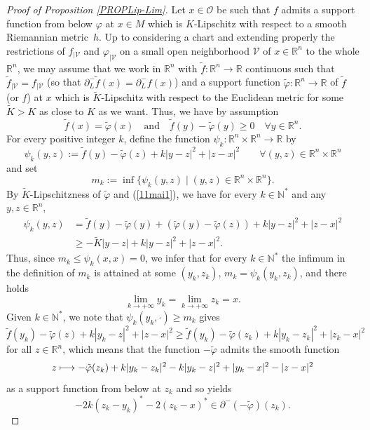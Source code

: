 \documentclass[JEP,XML,SOM,Unicode,NoFloatCountersInSection,published]{cedram}
\newcommand\mto{\mathchoice{\longmapsto}{\mapsto}{\mapsto}{\mapsto}}
\let\sep\mid
\newcommand\R{\mathbb R}
\newcommand\N{\mathbb N}
\theoremstyle{definition}
\begin{document}
\begin{proof}[Proof of Proposition \ref{PROPLip-Lim}]
Let $x\in \mathcal{O}$ be such that $f$ admits a support function from below $\varphi$ at $x\in M$ which is $K$-Lipschitz with respect to a smooth Riemannian metric~$h$. Up to considering a chart and extending properly the restrictions of $f_{\vert \mathcal{V}}$ and $\varphi_{\vert \mathcal{V}}$ on a small open neighborhood $\mathcal{V}$ of $x\in \R^n$ to the whole $\R^n$, we may assume that we work in $\R^n$ with $\tilde{f}:\R^n \to \R$ continuous such that $\tilde{f}_{\vert \mathcal{V}}=f_{\vert \mathcal{V}}$ (so that $\partial^-_L\tilde{f}(x)=\partial^-_Lf(x)$) and a support function $\tilde{\varphi}:\R^n \to \R$ of $\tilde{f}$ (or $f$) at $x$ which is $\tilde{K}$-Lipschitz with respect to the Euclidean metric for some $\tilde{K}>K$ as close to $K$ as we want. Thus, we have by assumption
\begin{equation}\label{11mai1}
\tilde{f}(x) = \tilde{\varphi}(x) \quad \text{and} \quad \tilde{f}(y) - \tilde{\varphi}(y) \geq 0 \quad \forall y \in \R^n.
\end{equation}
For every positive integer $k$, define the function $\psi_k :\R^n \times \R^n \to \R$ by
\[
\psi_k(y,z) := \tilde{f}(y) - \tilde{\varphi}(z) + k |y-z|^2 + |z-x|^2 \qquad \forall (y,z) \in \R^n \times \R^n
\]
and set
\[
m_k := \inf \bigl\{ \psi_k(y,z) \sep  (y,z) \in \R^n \times \R^n \bigr\}.
\]
By $\tilde{K}$-Lipschitzness of $\tilde{\varphi}$ and (\ref{11mai1}), we have for every $k\in \N^*$ and any $y,z\in \R^n$,
\begin{align*}
\psi_k(y,z) & = \tilde{f}(y) - \tilde{\varphi}(y) + \left(\tilde{\varphi}(y) - \tilde{\varphi}(z) \right) + k |y-z|^2 + |z-x|^2 \\
& \geq -\tilde{K} |y-z| + k |y-z|^2 + |z-x|^2.
\end{align*}
Thus, since $m_k\leq \psi_k(x,x)=0$, we infer that for every $k\in \N^*$ the infimum in the definition of $m_k$ is attained at some $(y_k,z_k)$, \ie $m_k = \psi_k(y_k,z_k)$, and there holds
\[
\lim_{k\to +\infty} y_k = \lim_{k\to +\infty} z_k = x.
\]
Given $k\in \N^*$, we note that $\psi_{k}(y_k,\cdot) \geq m_k$ gives
\[
\tilde{f}(y_k) - \tilde{\varphi}(z) + k |y_k-z|^2 + |z-x|^2 \geq \tilde{f}(y_k) - \tilde{\varphi} (z_k) + k |y_k-z_k|^2 + |z_k-x|^2
\]
for all $z\in \R^n$, which means that the function $- \tilde{\varphi}$ admits the smooth function
\[
z \mto - \tilde{\varphi}(z_k) + k |y_k-z_k|^2 - k |y_k-z|^2 + |y_k-x|^2 - |z-x|^2
\]
as a support function from below at $z_k$ and so yields
\[
-2k\left(z_k-y_k\right)^* -2 \left(z_k-x\right)^* \in \partial^- (-\tilde{\varphi})(z_k).
\]
\end{proof}
\end{document}
